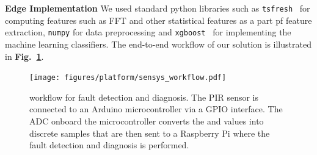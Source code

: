 \cb \textbf{Edge Implementation} We used standard python libraries such as \texttt{tsfresh}~\cite{tsfresh2018code,christ2016distributed} for computing features such as FFT and other statistical features as a part pf feature extraction, \texttt{numpy} for data preprocessing and 
\texttt{xgboost}~\cite{shap_implementation} for implementing the machine learning classifiers. %
The end-to-end workflow of our solution is illustrated in {\bfseries Fig.~\ref{fig:system_workflow}}.

\begin{figure}
    \begin{minipage}{0.9\textwidth}
	\centering
        \texttt{[image: figures/platform/sensys\_workflow.pdf]}
    	\caption{\sol workflow for fault detection and diagnosis. The PIR sensor is connected to an Arduino microcontroller via a GPIO interface. The ADC onboard the microcontroller converts the \aout and \cout values into discrete samples that are then sent to a Raspberry Pi where the fault detection and diagnosis is performed.}
	   \label{fig:system_workflow}
    \end{minipage}
\end{figure}%
%

